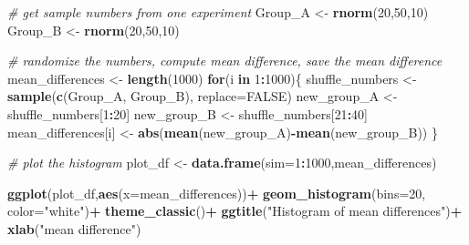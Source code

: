 \documentclass[]{book}
\newenvironment{Shaded}{\begin{snugshade}}{\end{snugshade}}
\newcommand{\KeywordTok}[1]{\textcolor[rgb]{0.13,0.29,0.53}{\textbf{#1}}}
\newcommand{\DataTypeTok}[1]{\textcolor[rgb]{0.13,0.29,0.53}{#1}}
\newcommand{\DecValTok}[1]{\textcolor[rgb]{0.00,0.00,0.81}{#1}}
\newcommand{\StringTok}[1]{\textcolor[rgb]{0.31,0.60,0.02}{#1}}
\newcommand{\CommentTok}[1]{\textcolor[rgb]{0.56,0.35,0.01}{\textit{#1}}}
\newcommand{\OtherTok}[1]{\textcolor[rgb]{0.56,0.35,0.01}{#1}}
\newcommand{\ControlFlowTok}[1]{\textcolor[rgb]{0.13,0.29,0.53}{\textbf{#1}}}
\newcommand{\OperatorTok}[1]{\textcolor[rgb]{0.81,0.36,0.00}{\textbf{#1}}}
\newcommand{\NormalTok}[1]{#1}
\begin{document}
\begin{Shaded}
\begin{Highlighting}[]
\CommentTok{# get sample numbers from one experiment}
\NormalTok{Group_A <-}\StringTok{ }\KeywordTok{rnorm}\NormalTok{(}\DecValTok{20}\NormalTok{,}\DecValTok{50}\NormalTok{,}\DecValTok{10}\NormalTok{)}
\NormalTok{Group_B <-}\StringTok{ }\KeywordTok{rnorm}\NormalTok{(}\DecValTok{20}\NormalTok{,}\DecValTok{50}\NormalTok{,}\DecValTok{10}\NormalTok{)}

\CommentTok{# randomize the numbers, compute mean difference, save the mean difference}
\NormalTok{mean_differences <-}\StringTok{ }\KeywordTok{length}\NormalTok{(}\DecValTok{1000}\NormalTok{)}
\ControlFlowTok{for}\NormalTok{(i }\ControlFlowTok{in} \DecValTok{1}\OperatorTok{:}\DecValTok{1000}\NormalTok{)\{}
\NormalTok{  shuffle_numbers <-}\StringTok{ }\KeywordTok{sample}\NormalTok{(}\KeywordTok{c}\NormalTok{(Group_A, Group_B), }\DataTypeTok{replace=}\OtherTok{FALSE}\NormalTok{)}
\NormalTok{  new_group_A <-}\StringTok{ }\NormalTok{shuffle_numbers[}\DecValTok{1}\OperatorTok{:}\DecValTok{20}\NormalTok{]}
\NormalTok{  new_group_B <-}\StringTok{ }\NormalTok{shuffle_numbers[}\DecValTok{21}\OperatorTok{:}\DecValTok{40}\NormalTok{]}
\NormalTok{  mean_differences[i] <-}\StringTok{ }\KeywordTok{abs}\NormalTok{(}\KeywordTok{mean}\NormalTok{(new_group_A)}\OperatorTok{-}\KeywordTok{mean}\NormalTok{(new_group_B))}
\NormalTok{\}}

\CommentTok{# plot the histogram}
\NormalTok{plot_df <-}\StringTok{ }\KeywordTok{data.frame}\NormalTok{(}\DataTypeTok{sim=}\DecValTok{1}\OperatorTok{:}\DecValTok{1000}\NormalTok{,mean_differences)}

\KeywordTok{ggplot}\NormalTok{(plot_df,}\KeywordTok{aes}\NormalTok{(}\DataTypeTok{x=}\NormalTok{mean_differences))}\OperatorTok{+}
\StringTok{  }\KeywordTok{geom_histogram}\NormalTok{(}\DataTypeTok{bins=}\DecValTok{20}\NormalTok{, }\DataTypeTok{color=}\StringTok{"white"}\NormalTok{)}\OperatorTok{+}
\StringTok{  }\KeywordTok{theme_classic}\NormalTok{()}\OperatorTok{+}
\StringTok{  }\KeywordTok{ggtitle}\NormalTok{(}\StringTok{"Histogram of mean differences"}\NormalTok{)}\OperatorTok{+}
\StringTok{  }\KeywordTok{xlab}\NormalTok{(}\StringTok{"mean difference"}\NormalTok{)}
\end{Highlighting}
\end{Shaded}
\end{document}
